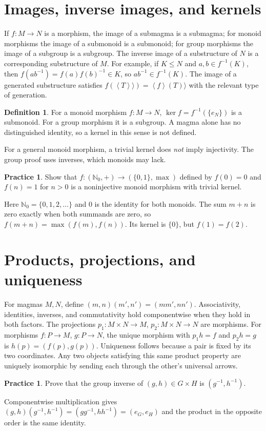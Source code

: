 \documentclass[11pt,openany]{book}
\newcommand{\N}{\mathbb N}\newcommand{\Z}{\mathbb Z}
\newcommand{\angles}[1]{\left\langle#1\right\rangle}
\theoremstyle{definition}
\newtheorem{definition}[theorem]{Definition}
\newtheorem{exercise}[theorem]{Practice}
\begin{document}
\section{Images, inverse images, and kernels}
If $f:M\to N$ is a morphism, the image of a submagma is a submagma; for monoid morphisms the image of a submonoid is a submonoid; for group morphisms the image of a subgroup is a subgroup. The inverse image of a substructure of $N$ is a corresponding substructure of $M$. For example, if $K\le N$ and $a,b\in f^{-1}(K)$, then $f(ab^{-1})=f(a)f(b)^{-1}\in K$, so $ab^{-1}\in f^{-1}(K)$. The image of a generated substructure satisfies $f(\angles T\rangle)=\angles f(T)\rangle$ with the relevant type of generation.
\begin{definition}For a monoid morphism $f:M\to N$, $\ker f=f^{-1}(\{e_N\})$ is a submonoid. For a group morphism it is a subgroup. A magma alone has no distinguished identity, so a kernel in this sense is not defined.\end{definition}
\begin{warningbox}For a general monoid morphism, a trivial kernel does \emph{not} imply injectivity. The group proof uses inverses, which monoids may lack.\end{warningbox}
\begin{exercise}Show that $f:(\N_0,+)\to(\{0,1\},\max)$ defined by $f(0)=0$ and $f(n)=1$ for $n>0$ is a noninjective monoid morphism with trivial kernel.\end{exercise}
\begin{solution}Here $\N_0=\{0,1,2,\dots\}$ and $0$ is the identity for both monoids. The sum $m+n$ is zero exactly when both summands are zero, so $f(m+n)=\max(f(m),f(n))$. Its kernel is $\{0\}$, but $f(1)=f(2)$.\end{solution}

\section{Products, projections, and uniqueness}
For magmas $M,N$, define $(m,n)(m',n')=(mm',nn')$. Associativity, identities, inverses, and commutativity hold componentwise when they hold in both factors. The projections $p_1:M\times N\to M$, $p_2:M\times N\to N$ are morphisms. For morphisms $f:P\to M$, $g:P\to N$, the unique morphism with $p_1h=f$ and $p_2h=g$ is $h(p)=(f(p),g(p))$. Uniqueness follows because a pair is fixed by its two coordinates. Any two objects satisfying this same product property are uniquely isomorphic by sending each through the other's universal arrows.
\begin{exercise}Prove that the group inverse of $(g,h)\in G\times H$ is $(g^{-1},h^{-1})$.\end{exercise}
\begin{solution}Componentwise multiplication gives $(g,h)(g^{-1},h^{-1})=(gg^{-1},hh^{-1})=(e_G,e_H)$ and the product in the opposite order is the same identity.\end{solution}
\end{document}

